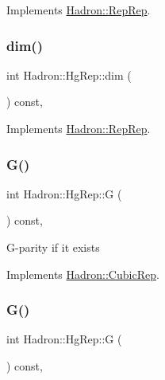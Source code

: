 Implements \mbox{\hyperlink{structHadron_1_1RepRep_a92c8802e5ed7afd7da43ccfd5b7cd92b}{Hadron\+::\+Rep\+Rep}}.

\mbox{\label{structHadron_1_1HgRep_ad951f39b175b012e73b0f66217b25032}} 
\subsubsection{\texorpdfstring{dim()}{dim()}\hspace{0.1cm}{\footnotesize\ttfamily [3/3]}}
{\footnotesize\ttfamily int Hadron\+::\+Hg\+Rep\+::dim (\begin{DoxyParamCaption}{ }\end{DoxyParamCaption}) const\hspace{0.3cm}{\ttfamily [inline]}, {\ttfamily [virtual]}}



Implements \mbox{\hyperlink{structHadron_1_1RepRep_a92c8802e5ed7afd7da43ccfd5b7cd92b}{Hadron\+::\+Rep\+Rep}}.

\mbox{\label{structHadron_1_1HgRep_a80baf377b3f2e8d633bba539efea8d04}} 
\subsubsection{\texorpdfstring{G()}{G()}\hspace{0.1cm}{\footnotesize\ttfamily [1/2]}}
{\footnotesize\ttfamily int Hadron\+::\+Hg\+Rep\+::G (\begin{DoxyParamCaption}{ }\end{DoxyParamCaption}) const\hspace{0.3cm}{\ttfamily [inline]}, {\ttfamily [virtual]}}

G-\/parity if it exists 

Implements \mbox{\hyperlink{structHadron_1_1CubicRep_a52104e43266d1614c00bbd1c3b395458}{Hadron\+::\+Cubic\+Rep}}.

\mbox{\label{structHadron_1_1HgRep_a80baf377b3f2e8d633bba539efea8d04}} 
\subsubsection{\texorpdfstring{G()}{G()}\hspace{0.1cm}{\footnotesize\ttfamily [2/2]}}
{\footnotesize\ttfamily int Hadron\+::\+Hg\+Rep\+::G (\begin{DoxyParamCaption}{ }\end{DoxyParamCaption}) const\hspace{0.3cm}{\ttfamily [inline]}, {\ttfamily [virtual]}}

